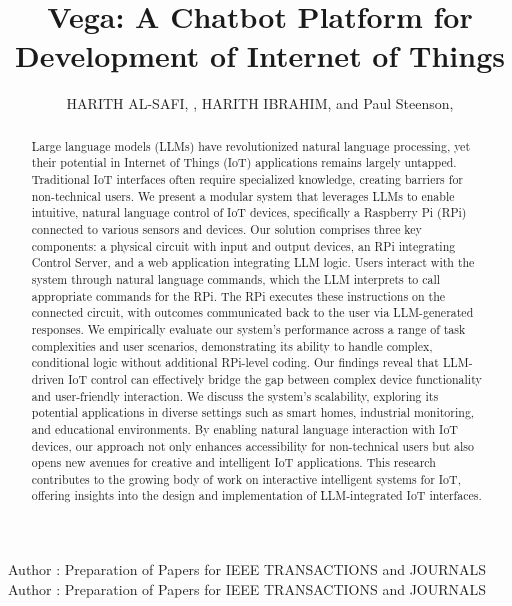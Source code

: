 \documentclass{ieeeaccess}
\begin{document}

\title{Vega: A Chatbot Platform for Development of Internet of Things}
\author{\uppercase{Harith Al-Safi}, ,
\uppercase{Harith Ibrahim}, and Paul Steenson,
}

\address{School of Electronics and Electrical Engineering, University of Leeds, Leeds LS2 9JT, U.K}

\markboth
{Author \headeretal: Preparation of Papers for IEEE TRANSACTIONS and JOURNALS}
{Author \headeretal: Preparation of Papers for IEEE TRANSACTIONS and JOURNALS}



\begin{abstract}
Large language models (LLMs) have revolutionized natural language processing, yet their potential in Internet of Things (IoT) applications remains largely untapped. Traditional IoT interfaces often require specialized knowledge, creating barriers for non-technical users. We present a modular system that leverages LLMs to enable intuitive, natural language control of IoT devices, specifically a Raspberry Pi (RPi) connected to various sensors and devices. Our solution comprises three key components: a physical circuit with input and output devices, an RPi integrating Control Server, and a web application integrating LLM logic. Users interact with the system through natural language commands, which the LLM interprets to call appropriate commands for the RPi. The RPi executes these instructions on the connected circuit, with outcomes communicated back to the user via LLM-generated responses. We empirically evaluate our system's performance across a range of task complexities and user scenarios, demonstrating its ability to handle complex, conditional logic without additional RPi-level coding. Our findings reveal that LLM-driven IoT control can effectively bridge the gap between complex device functionality and user-friendly interaction. We discuss the system's scalability, exploring its potential applications in diverse settings such as smart homes, industrial monitoring, and educational environments. By enabling natural language interaction with IoT devices, our approach not only enhances accessibility for non-technical users but also opens new avenues for creative and intelligent IoT applications. This research contributes to the growing body of work on interactive intelligent systems for IoT, offering insights into the design and implementation of LLM-integrated IoT interfaces.
\end{abstract}
\end{document}
